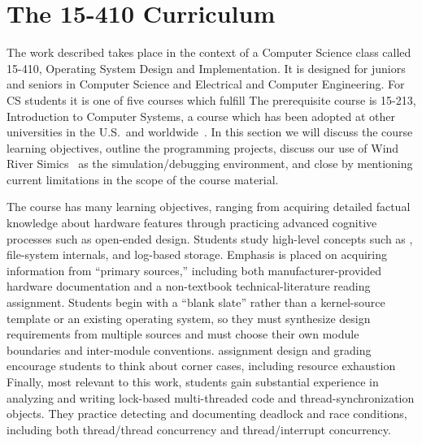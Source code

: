 \section{The 15-410 Curriculum}
\label{sec:curriculum}

The work described takes place in the context of a
Computer Science class called
15-410, Operating System Design and Implementation.
It is designed for juniors and seniors in Computer Science
and Electrical and Computer Engineering.
For CS students it is one of five courses which fulfill
The prerequisite course is 15-213,
Introduction to Computer Systems,
a course which has been adopted at other
universities in the U.S.\ and worldwide~\cite{sigcse01:CSaPP}.
In this section we will discuss the course learning
objectives,
outline the programming projects,
discuss our use of Wind River Simics~\cite{simics} as
the simulation/debugging environment,
and close by mentioning current limitations in the scope
of the course material.

The course has many learning objectives,
ranging from acquiring detailed factual knowledge about
hardware features
through practicing advanced cognitive processes
such as open-ended design.
%
Students study high-level concepts
such as
,
file-system internals,
and log-based storage.
%
Emphasis is placed on acquiring information from ``primary sources,''
including both manufacturer-provided hardware documentation
and a non-textbook technical-literature reading assignment.
%
Students begin with a ``blank slate'' rather than a
kernel-source template or an existing operating system,
so they must synthesize design requirements from multiple sources
and must
choose their own module boundaries and inter-module conventions.
%
assignment design and grading encourage students to
think about corner cases, including resource exhaustion
%
Finally, most relevant to this work,
students gain substantial experience in
analyzing and writing lock-based multi-threaded code and
thread-synchronization objects.
They practice detecting and documenting deadlock and race conditions,
including both thread/thread concurrency and thread/interrupt concurrency.

